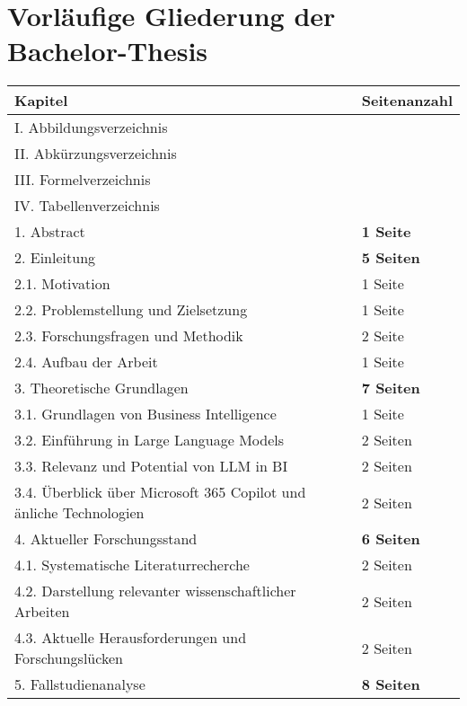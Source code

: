
\section{Vorläufige Gliederung der Bachelor-Thesis}


\begin{longtable}{|p{6cm}|p{6cm}|}
    \hline
    \textbf{Kapitel} & \textbf{Seitenanzahl} \\
    \hline
    I.      Abbildungsverzeichnis & \\
    \hline
    II.     Abkürzungsverzeichnis & \\
    \hline
    III.    Formelverzeichnis & \\
    \hline
    IV.     Tabellenverzeichnis & \\
    \hline
    1.  Abstract & \textbf{1 Seite} \\
    \hline
    2.  Einleitung & \textbf{5 Seiten} \\
    \hline
        2.1. Motivation & 1 Seite \\
        \hline
        2.2. Problemstellung und Zielsetzung & 1 Seite \\
        \hline
        2.3. Forschungsfragen und Methodik & 2 Seite \\
        \hline
        2.4. Aufbau der Arbeit & 1 Seite \\
    \hline
    3.  Theoretische Grundlagen & \textbf{7 Seiten} \\
    \hline
        3.1. Grundlagen von Business Intelligence & 1 Seite \\
        \hline
        3.2. Einführung in Large Language Models & 2 Seiten \\
        \hline
        3.3. Relevanz und Potential von LLM in BI & 2 Seiten \\
        \hline
        3.4. Überblick über Microsoft 365 Copilot und änliche Technologien & 2 Seiten \\
    \hline
    4. Aktueller Forschungsstand & \textbf{6 Seiten} \\
    \hline
        4.1. Systematische Literaturrecherche & 2 Seiten \\
        \hline
        4.2. Darstellung relevanter wissenschaftlicher Arbeiten & 2 Seiten \\
        \hline
        4.3. Aktuelle Herausforderungen und Forschungslücken & 2 Seiten \\
    \hline
    5. Fallstudienanalyse & \textbf{8 Seiten} \\

\end{longtable}
